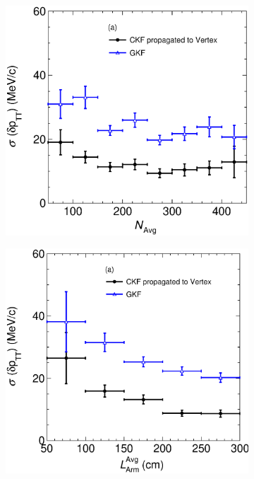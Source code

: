 \begin{figure}[t]
     \centering
     \begin{subfigure}[b]{0.32\textwidth}
         \centering
         \includegraphics[width=\textwidth]{figures/ch6-TKI/2D/deltapTTVSAvgN.eps}
         \caption{}
         \label{fig:deltapTTVSAvgN}
     \end{subfigure}
     \begin{subfigure}[b]{0.32\textwidth}
         \centering
         \includegraphics[width=\textwidth]{figures/ch6-TKI/2D/deltapTTVSAvglArmMC.eps}

\end{subfigure}
\end{figure}
